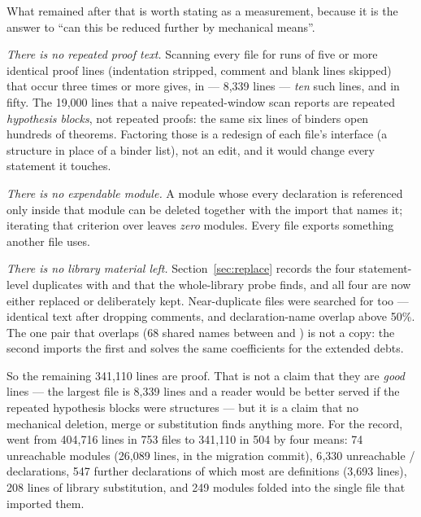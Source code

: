 What remained after that is worth stating as a measurement, because it is the answer to
``can this be reduced further by mechanical means''.

\emph{There is no repeated proof text.} Scanning every  file for runs of
five or more identical proof lines (indentation stripped, comment and blank lines skipped)
that occur three times or more gives, in  --- 8{,}339 lines ---
\emph{ten} such lines, and in  fifty. The 19{,}000 lines
that a naive repeated-window scan reports are repeated \emph{hypothesis blocks}, not repeated
proofs: the same six lines of binders open hundreds of theorems. Factoring those is a
redesign of each file's interface (a structure in place of a binder list), not an edit, and
it would change every statement it touches.

\emph{There is no expendable module.} A module whose every declaration is referenced only
inside that module can be deleted together with the import that names it; iterating that
criterion over  leaves \emph{zero} modules. Every file exports something
another file uses.

\emph{There is no library material left.} Section~\ref{sec:replace} records the four
statement-level duplicates with \Mathlib{} and \TauCeti{} that the whole-library probe finds,
and all four are now either replaced or deliberately kept. Near-duplicate files were searched
for too --- identical text after dropping comments, and declaration-name overlap above 50\%.
The one pair that overlaps (68 shared names between  and
) is not a copy: the second imports the first and solves the
same coefficients for the extended debts.

So the remaining 341{,}110 lines are proof. That is not a claim that they are \emph{good}
lines --- the largest file is 8{,}339 lines and a reader would be better served if the
repeated hypothesis blocks were structures --- but it is a claim that no mechanical
deletion, merge or substitution finds anything more. For the record, 
went from 404{,}716 lines in 753 files to 341{,}110 in 504 by four means: 74 unreachable
modules (26{,}089 lines, in the migration commit), 6{,}330 unreachable
/ declarations, 547 further declarations of which most are
definitions (3{,}693 lines), 208 lines of library substitution, and 249 modules folded into
the single file that imported them.

